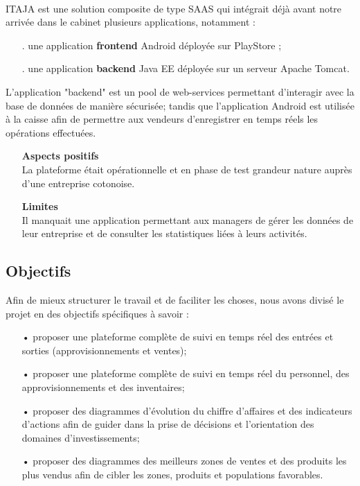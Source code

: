 \documentclass[12pt]{report}
\begin{document}
	\paragraph{}
	  ITAJA est une solution composite de type \gls{SAAS} qui intégrait déjà avant notre arrivée dans le cabinet plusieurs applications, notamment :
	  \begin{itemize}
	    \item[.] une application \textbf{frontend} Android déployée sur PlayStore ;
	    \item[.] une application \textbf{backend} Java EE déployée sur un serveur Apache Tomcat.
	  \end{itemize}
	  
	  L’application "backend" est un pool de web-services permettant d’interagir avec la base de données de manière sécurisée; tandis que l’application Android est utilisée à la caisse afin de permettre aux vendeurs d’enregistrer en temps réels les opérations effectuées.
	  
	  \begin{itemize}
	    \item[\ding{42}] \textbf{Aspects positifs}\\
	      La plateforme était opérationnelle et en phase de test grandeur nature auprès d’une entreprise cotonoise.

	    \item[\ding{42}] \textbf{Limites}\\
	      Il manquait une application permettant aux managers de gérer les données de leur entreprise et de consulter les statistiques liées à leurs activités.
	 \end{itemize}
	

	\subsection{Objectifs}
	  Afin de mieux structurer le travail et de faciliter les choses, nous avons divisé le projet en des objectifs spécifiques à savoir :
	  \begin{itemize}
	    \item[•] proposer une plateforme complète de suivi en temps réel des entrées et sorties (approvisionnements et ventes);
	    \item[•] proposer une plateforme complète de suivi en temps réel du personnel, des approvisionnements et des inventaires;
	    \item[•] proposer des diagrammes d'évolution du chiffre d'affaires et des indicateurs d'actions afin de guider dans la prise de décisions et l'orientation des domaines d'investissements;
	    \item[•] proposer des diagrammes des meilleurs zones de ventes et des produits les plus vendus afin de cibler les zones, produits et populations favorables.
	  \end{itemize}
     
\end{document}
